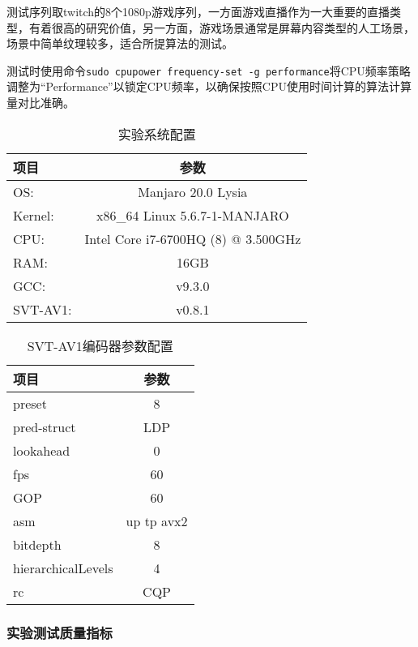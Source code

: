   测试序列取twitch的8个1080p游戏序列，一方面游戏直播作为一大重要的直播类型，有着很高的研究价值，另一方面，游戏场景通常是屏幕内容类型的人工场景，场景中简单纹理较多，适合所提算法的测试。

  测试时使用命令\texttt{sudo cpupower frequency-set -g performance}将CPU频率策略调整为“Performance”以锁定CPU频率，以确保按照CPU使用时间计算的算法计算量对比准确。

  \begin{table}[!hpt]
    \renewcommand{\arraystretch}{0.9}
    \caption{实验系统配置}
    \label{tab:os}
    \centering
    \begin{tabular}{lc} \toprule
      项目& 参数  \\ \midrule
      OS:     &Manjaro 20.0 Lysia\\
      Kernel: & x86\_64 Linux 5.6.7-1-MANJARO\\
      CPU:    &Intel Core i7-6700HQ (8) @ 3.500GHz\\
      RAM:    &16GB\\
      GCC:    &v9.3.0\\
      SVT-AV1: & v0.8.1\\ \bottomrule
    \end{tabular}
  \end{table}

  \begin{table}[!hpt]
    \renewcommand{\arraystretch}{0.9}
    \caption{SVT-AV1编码器参数配置}
    \label{tab:svt}
    \centering
    \begin{tabular}{lc} \toprule
      项目& 参数  \\ \midrule
      preset     &8\\
      pred-struct& LDP\\
      lookahead    &0\\
      fps    &60\\
      GOP    &60\\
      asm    & up tp avx2\\
      bitdepth & 8\\
      hierarchicalLevels  & 4 \\
      rc & CQP\\ \bottomrule
    \end{tabular}
  \end{table}

	\subsubsection{实验测试质量指标}

